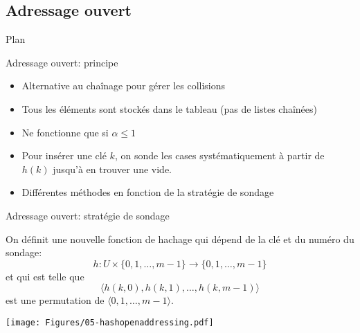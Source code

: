 \subsection{Adressage ouvert}

\begin{frame}{Plan}


\end{frame}


\begin{frame}{Adressage ouvert: principe}

\begin{itemize}
\item Alternative au chaînage pour gérer les collisions
\item Tous les éléments sont stockés dans le tableau (pas de listes chaînées)
\item Ne fonctionne que si $\alpha\leq 1$
\item Pour insérer une clé $k$, on \alert{sonde} les cases
  systématiquement à partir de $h(k)$ jusqu'à en trouver une vide.
\item Différentes méthodes en fonction de la stratégie de sondage
\end{itemize}

\end{frame}

\begin{frame}{Adressage ouvert: stratégie de sondage}

On définit une nouvelle fonction de hachage qui dépend de la clé
  et du numéro du sondage:
$$h:U\times\{0,1,\ldots,m-1\} \rightarrow \{0,1,\ldots,m-1\}$$
et qui est telle que
$$\langle h(k,0), h(k,1), \ldots, h(k,m-1)\rangle$$
est une permutation de $\langle 0, 1, \ldots, m-1\rangle$.


\centerline{\texttt{[image: Figures/05-hashopenaddressing.pdf]}}

\end{frame}

